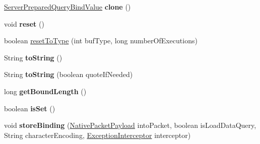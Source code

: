 \begin{DoxyCompactItemize}
\item 
\mbox{\label{classcom_1_1mysql_1_1cj_1_1_server_prepared_query_bind_value_a39d3a4826771b5a98c108bcbfd630d0f}} 
\mbox{\hyperlink{classcom_1_1mysql_1_1cj_1_1_server_prepared_query_bind_value}{Server\+Prepared\+Query\+Bind\+Value}} {\bfseries clone} ()
\item 
\mbox{\label{classcom_1_1mysql_1_1cj_1_1_server_prepared_query_bind_value_ace2cd66fa5ce7b60d1ddb0c919ec5783}} 
void {\bfseries reset} ()
\item 
boolean \mbox{\hyperlink{classcom_1_1mysql_1_1cj_1_1_server_prepared_query_bind_value_a425bdbe24e9b3820488c0f936315229a}{reset\+To\+Type}} (int buf\+Type, long number\+Of\+Executions)
\item 
\mbox{\label{classcom_1_1mysql_1_1cj_1_1_server_prepared_query_bind_value_a42362563dfa8fb2023de2d0c6734abff}} 
String {\bfseries to\+String} ()
\item 
\mbox{\label{classcom_1_1mysql_1_1cj_1_1_server_prepared_query_bind_value_a05b09f6b71e326440cac60a365ec6b00}} 
String {\bfseries to\+String} (boolean quote\+If\+Needed)
\item 
\mbox{\label{classcom_1_1mysql_1_1cj_1_1_server_prepared_query_bind_value_aeb5d121e9780688fc03f8edf1404fcd9}} 
long {\bfseries get\+Bound\+Length} ()
\item 
\mbox{\label{classcom_1_1mysql_1_1cj_1_1_server_prepared_query_bind_value_a53324f0183c3d2b6d99247114a32b60c}} 
boolean {\bfseries is\+Set} ()
\item 
\mbox{\label{classcom_1_1mysql_1_1cj_1_1_server_prepared_query_bind_value_a80d68503220f9c21865a8815b7793258}} 
void {\bfseries store\+Binding} (\mbox{\hyperlink{classcom_1_1mysql_1_1cj_1_1protocol_1_1a_1_1_native_packet_payload}{Native\+Packet\+Payload}} into\+Packet, boolean is\+Load\+Data\+Query, String character\+Encoding, \mbox{\hyperlink{interfacecom_1_1mysql_1_1cj_1_1exceptions_1_1_exception_interceptor}{Exception\+Interceptor}} interceptor)
\end{DoxyCompactItemize}
